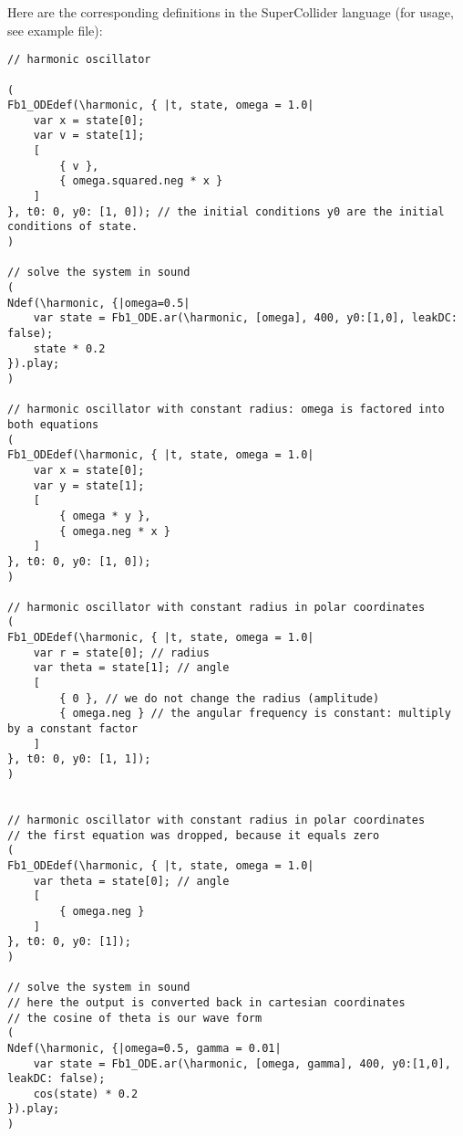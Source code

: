 \documentclass{article}
\begin{document}
Here are the corresponding definitions in the SuperCollider language (for usage, see example file):

\begin{lstlisting}[caption=The symmetric oscillator and the oscillation on the circle.]
// harmonic oscillator

(
Fb1_ODEdef(\harmonic, { |t, state, omega = 1.0|
	var x = state[0];
	var v = state[1];
	[
		{ v },
		{ omega.squared.neg * x }
	]
}, t0: 0, y0: [1, 0]); // the initial conditions y0 are the initial conditions of state.
)

// solve the system in sound
(
Ndef(\harmonic, {|omega=0.5|
	var state = Fb1_ODE.ar(\harmonic, [omega], 400, y0:[1,0], leakDC: false);
	state * 0.2
}).play;
)

// harmonic oscillator with constant radius: omega is factored into both equations
(
Fb1_ODEdef(\harmonic, { |t, state, omega = 1.0|
	var x = state[0];
	var y = state[1];
	[
		{ omega * y },
		{ omega.neg * x }
	]
}, t0: 0, y0: [1, 0]);
)

// harmonic oscillator with constant radius in polar coordinates
(
Fb1_ODEdef(\harmonic, { |t, state, omega = 1.0|
	var r = state[0]; // radius
	var theta = state[1]; // angle
	[
		{ 0 }, // we do not change the radius (amplitude)
		{ omega.neg } // the angular frequency is constant: multiply by a constant factor
	]
}, t0: 0, y0: [1, 1]);
)


// harmonic oscillator with constant radius in polar coordinates
// the first equation was dropped, because it equals zero
(
Fb1_ODEdef(\harmonic, { |t, state, omega = 1.0|
	var theta = state[0]; // angle
	[
		{ omega.neg }
	]
}, t0: 0, y0: [1]);
)

// solve the system in sound
// here the output is converted back in cartesian coordinates
// the cosine of theta is our wave form
(
Ndef(\harmonic, {|omega=0.5, gamma = 0.01|
	var state = Fb1_ODE.ar(\harmonic, [omega, gamma], 400, y0:[1,0], leakDC: false);
	cos(state) * 0.2 
}).play;
)


\end{lstlisting}
\end{document}
